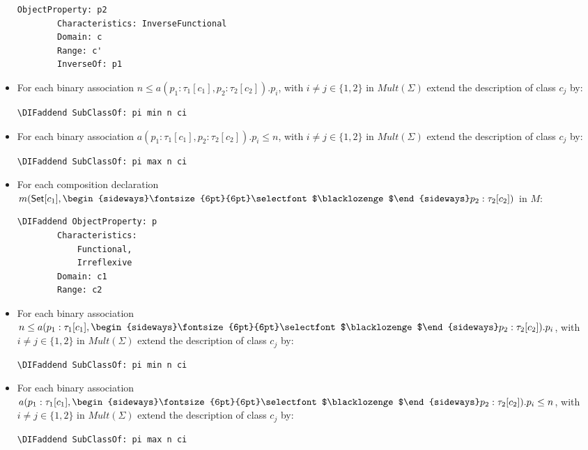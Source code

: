 \documentclass[10pt,fleqn,final]{scrreprt}
\newenvironment{definitions}[0]{\medskip }{}
\newcommand{\composition}{\raisebox{0.2pt}{\begin{sideways}\fontsize{6pt}{6pt}\selectfont$\blacklozenge$\end{sideways}}}
\providecommand{\DIFaddbegin}{} %
\providecommand{\DIFaddend}{} %
\providecommand{\DIFdelbegin}{} %
\providecommand{\DIFdelend}{} %
\begin{document}
\begin{definitions}
\begin{itemize}
\begin{lstlisting}[language=owl2Manchester]
	ObjectProperty: p2
		Characteristics: InverseFunctional
		Domain: c
		Range: c'
		InverseOf: p1
\end{lstlisting}
\item For each binary association $n \leq a(p_1:\tau_1[c_1],p_2:\tau_2[c_2]).p_i$, with $i \neq j\in\{1,2\}$ in $\mathit{Mult}(\Sigma)$ extend the description of class $c_j$ by:
\DIFdelbegin %
\DIFdelend \DIFaddbegin \begin{lstlisting}[language=owl2Manchester]
	\DIFaddend SubClassOf: pi min n ci
\end{lstlisting}
\item For each binary association $a(p_1:\tau_1[c_1],p_2:\tau_2[c_2]).p_i \leq n$, with $i \neq j\in\{1,2\}$  in $\mathit{Mult}(\Sigma)$ extend the description of class $c_j$ by:
\DIFdelbegin %
\DIFdelend \DIFaddbegin \begin{lstlisting}[language=owl2Manchester]
	\DIFaddend SubClassOf: pi max n ci
\end{lstlisting}
\item For each composition declaration $m(\mathsf{Set}[c_1], \composition p_2 :
\tau_2[c_2])$ in $M$:
\DIFdelbegin %
\DIFdelend \DIFaddbegin \begin{lstlisting}[language=owl2Manchester]
	\DIFaddend ObjectProperty: p
		Characteristics:
			Functional, 
			Irreflexive
		Domain: c1
		Range: c2
\end{lstlisting}
\item For each binary association $n \leq a(p_1:\tau_1[c_1], \composition p_2:\tau_2[c_2]).p_i$, with $i \neq j\in\{1,2\}$  in $\mathit{Mult}(\Sigma)$  extend the description of class $c_j$ by:
\DIFdelbegin %
\DIFdelend \DIFaddbegin \begin{lstlisting}[language=owl2Manchester]
	\DIFaddend SubClassOf: pi min n ci
\end{lstlisting}
\item For each binary association $a(p_1:\tau_1[c_1], \composition p_2:\tau_2[c_2]).p_i \leq n$, with $i \neq j\in\{1,2\}$  in $\mathit{Mult}(\Sigma)$ extend the description of class $c_j$ by:
\DIFdelbegin %
\DIFdelend \DIFaddbegin \begin{lstlisting}[language=owl2Manchester]
	\DIFaddend SubClassOf: pi max n ci
\end{lstlisting}
\end{itemize}



\end{definitions}
\end{document}
